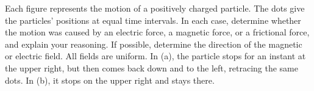 Each figure represents the motion of a positively charged particle. The dots give the
        particles' positions at equal time intervals. In each case, determine
        whether the motion was caused by an electric force, a magnetic force,
        or a frictional force, and explain your reasoning. If possible, determine
        the direction of the magnetic or electric field. All fields are uniform.
        In (a), the particle stops for an instant at the upper right, but then
        comes back down and to the left, retracing the same dots.
        In (b), it stops on the upper right and stays there.
